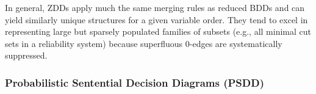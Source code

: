 In general, ZDDs apply much the same merging rules as reduced BDDs and can yield similarly unique structures for a given variable order. They tend to excel in representing large but sparsely populated families of subsets (e.g., all minimal cut sets in a reliability system) because superfluous 0-edges are systematically suppressed.

\subsubsection{Probabilistic Sentential Decision Diagrams (PSDD)}